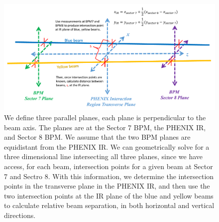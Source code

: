\begin{figure}
\begin{center}
\includegraphics[width=1.0\linewidth]{./figures/bpm_ir_beam_separation}
\caption{We define three parallel planes, each plane is perpendicular to the beam axis.
The planes are at the Sector 7 BPM, the PHENIX IR, and Sector 8 BPM. We assume that the
two BPM planes are equidistant from the PHENIX IR. We can geometrically solve for a three
dimensional line intersecting all three planes, since we have access, for each beam,
intersection points for a given beam at Sector 7 and Sectro 8. With this information, we
determine the intersection points in the transverse plane in the PHENIX IR, and then use
the two intersection points at the IR plane of the blue and yellow beams to calculate
relative beam separation, in both horizontal and vertical directions.}
\label{fig:bpm_ir_xing_cartoon}
\end{center}
\end{figure}

